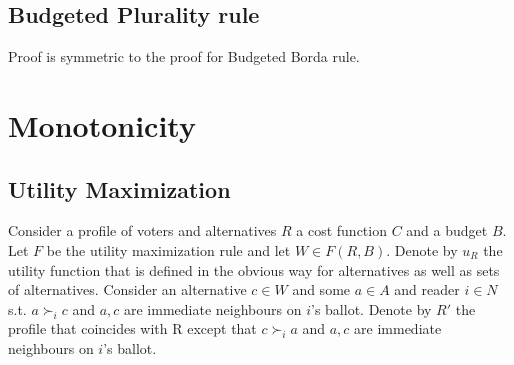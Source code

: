 \documentclass{article}
\begin{document}
\subsection{Budgeted Plurality rule}
Proof is symmetric to the proof for Budgeted Borda rule. 
\section{Monotonicity}

\subsection{Utility Maximization}

Consider a profile of voters and alternatives $R$ a cost function $C$ and a budget $B$. Let $F$ be the utility maximization rule and let $W\in F(R,B)$. Denote by $u_R$ the utility function that is defined in the obvious way for alternatives as well as sets of alternatives. Consider an alternative $c\in W$ and some $a\in A$ and reader $i\in N$  s.t. $a\succ_i c$ and $a,c$ are immediate neighbours on $i$'s ballot. Denote by $R'$ the profile that coincides with R except that $c\succ_i a$ and $a,c$ are immediate neighbours on $i$'s ballot.
\end{document}
